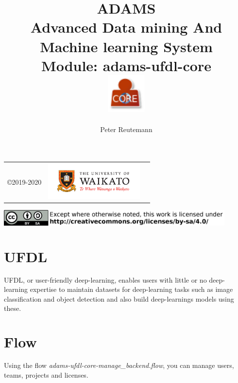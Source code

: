 \documentclass[a4paper]{book}
\title{
  \textbf{ADAMS} \\
  {\Large \textbf{A}dvanced \textbf{D}ata mining \textbf{A}nd \textbf{M}achine
  learning \textbf{S}ystem} \\
  {\Large Module: adams-ufdl-core} \\
  \vspace{1cm}
  \includegraphics[width=2cm]{images/ufdl-core-module.png} \\
}
\author{
  Peter Reutemann
}
\begin{document}
\begin{titlepage}
\maketitle

\thispagestyle{empty}
\center
\begin{table}[b]
	\begin{tabular}{c l l}
		\parbox[c][2cm]{2cm}{\copyright 2019-2020} &
		\parbox[c][2cm]{5cm}{\includegraphics[width=5cm]{images/coat_of_arms.pdf}} \\
	\end{tabular}
	\includegraphics[width=12cm]{images/cc.png} \\
\end{table}

\end{titlepage}

\tableofcontents

\chapter{UFDL}
UFDL, or user-friendly deep-learning, enables users with little or no deep-learning
expertise to maintain datasets for deep-learning tasks such as image classification
and object detection and also build deep-learnings models using these.

\chapter{Flow}
Using the flow \textit{adams-ufdl-core-manage\_backend.flow},
you can manage users, teams, projects and licenses.
\end{document}
